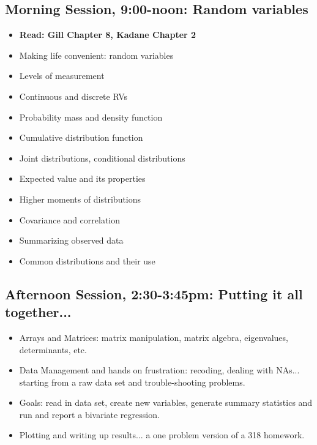 \documentclass[12pt,a4paper]{article}
\begin{document}
\subsection*{Morning Session, 9:00-noon: Random variables}
\begin{itemize}
\setlength{\itemsep}{0pt}
\footnotesize
\item \textbf{Read: Gill Chapter 8, Kadane Chapter 2}
\item Making life convenient: random variables
\item Levels of measurement
\item Continuous and discrete RVs
\item Probability mass and density function
\item Cumulative distribution function
\item Joint distributions, conditional distributions
\item Expected value and its properties
\item Higher moments of distributions
\item Covariance and correlation
\item Summarizing observed data
\item Common distributions and their use
\end{itemize}



\subsection*{Afternoon Session, 2:30-3:45pm: Putting it all together...}
\begin{itemize}
\setlength{\itemsep}{0pt}
\footnotesize
\item Arrays and Matrices: matrix manipulation, matrix algebra, eigenvalues, determinants, etc.
\item Data Management and hands on frustration: recoding, dealing with NAs... starting from a raw data set and trouble-shooting problems.
\item Goals: read in data set, create new variables, generate summary statistics and run and report a bivariate regression.
\item Plotting and writing up results... a one problem version of a 318 homework.
\end{itemize}


 
\end{document}
